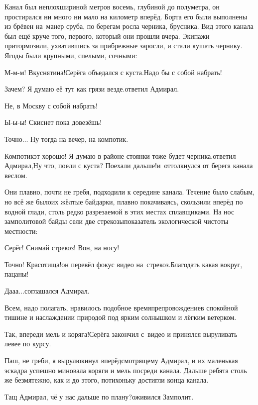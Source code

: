 Канал был неплох\mdash шириной метров восемь, глубиной до полуметра, он простирался ни много ни мало на километр вперёд. Борта его были выполнены из брёвен на~манер сруба, по берегам росла черника, брусника. Вид этого канала был ещё круче того, первого, который они прошли вчера. Экипажи притормозили, ухватившись за прибрежные заросли, и стали кушать чернику. Ягоды были крупными, спелыми, сочными:

\diagdash М-м-м! Вкуснятина!\mdash Серёга объедался с куста.\mdash Надо бы с собой набрать!

\diagdash Зачем? Я думаю её тут как грязи везде.\mdash ответил Адмирал.

\diagdash Не, в Москву с собой набрать!

\diagdash Ы-ы-ы! Скиснет пока довезёшь!

\diagdash Точно$\ldots$ Ну тогда на вечер, на компотик.

\diagdash Компотик\mdash эт хорошо! Я думаю в районе стоянки тоже будет черника.\mdash ответил Адмирал,\mdash Ну что, поели с куста? Поехали дальше!\mdash и~оттолкнулся от берега канала веслом.

Они плавно, почти не гребя, подходили к середине канала. Течение было слабым, но всё же было\mdash их жёлтые байдарки, плавно покачиваясь, скользили вперёд по водной глади, столь редко разрезаемой в этих местах сплавщиками. На нос замполитовой байды сели две стрекозы\mdash показатель экологической чистоты местности:

\diagdash Серёг! Снимай стрекоз! Вон, на носу!

\diagdash Точно! Красотища!\mdash он перевёл фокус видео на~стрекоз.\mdash Благодать какая вокруг, пацаны!

\diagdash Да\sdash а\sdash а$\ldots$\mdash соглашался Адмирал.

Всем, надо полагать, нравилось подобное времяпрепровождение\mdash в спокойной тишине и наслаждении природой под ярким солнышком и лёгким ветерком. 

\diagdash Так, впереди мель и коряга!\mdash Серёга закончил с~видео и принялся выруливать левее по курсу. 

\diagdash Паш, не греби, я вырулю\mdash кинул вперёдсмотрящему Адмирал, и их маленькая эскадра успешно миновала коряги и мель посреди канала. Дальше ребята столь же безмятежно, как и до этого, потихоньку достигли конца канала.

\diagdash Тащ Адмирал, чё у нас дальше по плану?\mdash оживился Замполит.

